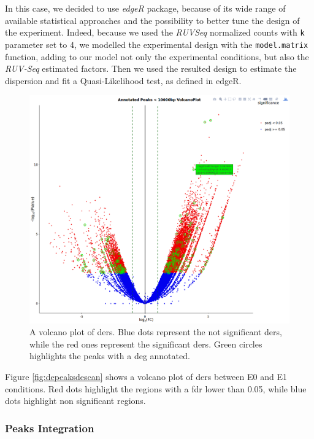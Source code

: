 In this case, we decided to use \textit{edgeR} package, because of its wide range of  available statistical approaches and the possibility to better tune the design of the experiment. 
Indeed, because we used the \textit{RUVSeq} normalized counts with \lstinline!k! parameter set to 4, we modelled the experimental design with the \lstinline!model.matrix! function, adding to our model not only the experimental conditions, but also the \textit{RUV-Seq} estimated factors.
Then we used the resulted design to estimate the dispersion and fit a Quasi-Likelihood test, as defined in edgeR\cite{Robinson2009}.
 
\begin{figure}[H]
\centering
\includegraphics[width=\textwidth, keepaspectratio]{img/descan2/Annotated_depeaks_degenes.png}
\caption[Annotated Differential Enrichment Regions Volcano]{A volcano plot of \glspl{der}. Blue dots represent the not significant \glspl{der}, while the red ones represent the significant \glspl{der}. Green circles highlights the peaks with a \gls{deg} annotated.}
\label{fig:depeakdegenessdescan}
\centering
\end{figure}

Figure \ref{fig:depeaksdescan} shows a volcano plot of \glspl{der} between E0 and E1 conditions.
Red dots highlight the regions with a \gls{fdr}\cite{Benjamini1995} lower than 0.05, while blue dots highlight non significant regions.

\subsubsection{Peaks Integration}

